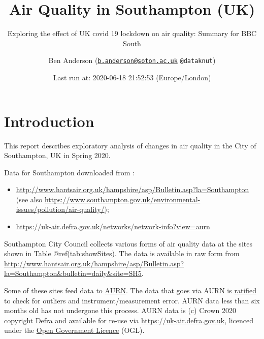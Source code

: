\documentclass[]{article}
\title{Air Quality in Southampton (UK)}
\subtitle{Exploring the effect of UK covid 19 lockdown on air quality: Summary for
BBC South}
\author{Ben Anderson
(\href{mailto:b.anderson@soton.ac.uk}{\nolinkurl{b.anderson@soton.ac.uk}}
\texttt{@dataknut})}
\date{Last run at: 2020-06-18 21:52:53 (Europe/London)}
\newenvironment{Shaded}{\begin{snugshade}}{\end{snugshade}}
\newcommand{\KeywordTok}[1]{\textcolor[rgb]{0.13,0.29,0.53}{\textbf{#1}}}
\newcommand{\StringTok}[1]{\textcolor[rgb]{0.31,0.60,0.02}{#1}}
\newcommand{\OperatorTok}[1]{\textcolor[rgb]{0.81,0.36,0.00}{\textbf{#1}}}
\newcommand{\NormalTok}[1]{#1}
\providecommand{\tightlist}{%
  \setlength{\itemsep}{0pt}\setlength{\parskip}{0pt}}
\begin{document}
\maketitle

{
\setcounter{tocdepth}{2}
\tableofcontents
}
\section{Introduction}\label{introduction}

This report describes exploratory analysis of changes in air quality in
the City of Southampton, UK in Spring 2020.

\begin{Shaded}
\end{Shaded}

Data for Southampton downloaded from :

\begin{itemize}
\tightlist
\item
  \url{http://www.hantsair.org.uk/hampshire/asp/Bulletin.asp?la=Southampton}
  (see also
  \url{https://www.southampton.gov.uk/environmental-issues/pollution/air-quality/});
\item
  \url{https://uk-air.defra.gov.uk/networks/network-info?view=aurn}
\end{itemize}

Southampton City Council collects various forms of air quality data at
the sites shown in Table @ref(tab:showSites). The data is available in
raw form from
\url{http://www.hantsair.org.uk/hampshire/asp/Bulletin.asp?la=Southampton\&bulletin=daily\&site=SH5}.

Some of these sites feed data to
\href{https://uk-air.defra.gov.uk/networks/network-info?view=aurn}{AURN}.
The data that goes via AURN is
\href{https://uk-air.defra.gov.uk/assets/documents/Data_Validation_and_Ratification_Process_Apr_2017.pdf}{ratified}
to check for outliers and instrument/measurement error. AURN data less
than six months old has not undergone this process. AURN data is (c)
Crown 2020 copyright Defra and available for re-use via
\url{https://uk-air.defra.gov.uk}, licenced under the
\href{http://www.nationalarchives.gov.uk/doc/open-government-licence/version/2/}{Open
Government Licence} (OGL).
\end{document}
